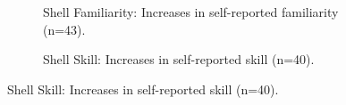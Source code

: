 \documentclass[10pt, twocolumn]{article}
\begin{document}
\begin{figure}
\centering
\begin{subfigure}[t]{0.47\columnwidth}
    \centering
    \caption{Shell Familiarity: Increases in self-reported familiarity (n=43).  \label{shellFamiliarity}}

\end{subfigure}
\begin{subfigure}[t]{0.47\columnwidth}
    \centering
    \caption{Shell Skill: Increases in self-reported skill (n=40).  \label{shellSkill}}


\end{subfigure}
\end{figure}
\end{document}
